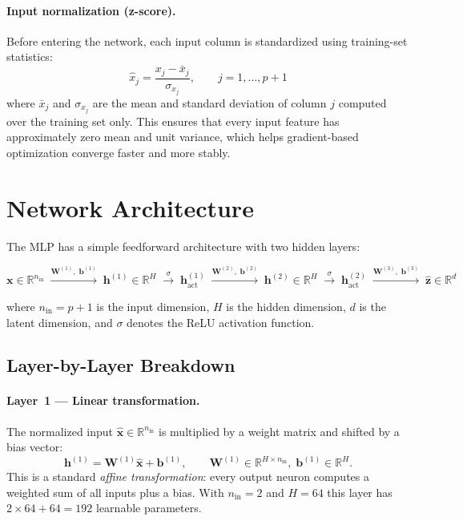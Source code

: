 \documentclass[11pt,a4paper]{article}
\newcommand{\R}{\mathbb{R}}
\newcommand{\bz}{\mathbf{z}}
\newcommand{\bx}{\mathbf{x}}
\newcommand{\bW}{\mathbf{W}}
\newcommand{\bb}{\mathbf{b}}
\newcommand{\bh}{\mathbf{h}}
\begin{document}
\paragraph{Input normalization (z-score).}
Before entering the network, each input column is standardized using
training-set statistics:
\[
  \hat{x}_j = \frac{x_j - \bar{x}_j}{\sigma_{x_j}}
  ,\qquad j = 1,\ldots, p+1
\]
where $\bar{x}_j$ and $\sigma_{x_j}$ are the mean and standard
deviation of column $j$ computed over the training set only.
This ensures that every input feature has approximately zero mean
and unit variance, which helps gradient-based optimization converge
faster and more stably.

\section{Network Architecture}

The MLP has a simple feedforward architecture with two hidden layers:

\[
  \bx \in \R^{n_{\mathrm{in}}}
  \;\xrightarrow{\bW^{(1)},\;\bb^{(1)}}\;
  \bh^{(1)} \in \R^{H}
  \;\xrightarrow{\;\sigma\;}\;
  \bh^{(1)}_{\text{act}}
  \;\xrightarrow{\bW^{(2)},\;\bb^{(2)}}\;
  \bh^{(2)} \in \R^{H}
  \;\xrightarrow{\;\sigma\;}\;
  \bh^{(2)}_{\text{act}}
  \;\xrightarrow{\bW^{(3)},\;\bb^{(3)}}\;
  \hat{\bz} \in \R^{d}
\]

where $n_{\mathrm{in}} = p + 1$ is the input dimension, $H$ is the hidden
dimension, $d$ is the latent dimension, and $\sigma$ denotes the ReLU
activation function.

\subsection{Layer-by-Layer Breakdown}

\paragraph{Layer~1 --- Linear transformation.}
The normalized input $\hat{\bx} \in \R^{n_{\mathrm{in}}}$ is multiplied
by a weight matrix and shifted by a bias vector:
\[
  \bh^{(1)} = \bW^{(1)} \hat{\bx} + \bb^{(1)}
  ,\qquad
  \bW^{(1)} \in \R^{H \times n_{\mathrm{in}}},\;
  \bb^{(1)} \in \R^{H}.
\]
This is a standard \emph{affine transformation}: every output neuron
computes a weighted sum of all inputs plus a bias.  With
$n_{\mathrm{in}}=2$ and $H=64$ this layer has $2\times64 + 64 = 192$
learnable parameters.
\end{document}
